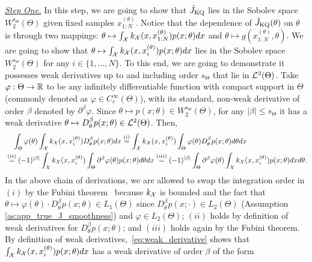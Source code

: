 \underline{\emph{Step One.}} In this step, we are going to show that $\hat{J}_{\text{KQ}}$ lies in the Sobolev space $W_2^{s_\Theta} (\Theta)$ given fixed samples $x_{1:N}^{(\theta)}$. 
Notice that the dependence of $\hat{J}_{\text{KQ}}(\theta)$ on $\theta$ is through two mappings: $\theta \mapsto \int_{\mathcal{X}} k_{\mathcal{X}} (x, x_{1:N}^{(\theta)}) p(x; \theta) dx$ and $\theta \mapsto g(x_{1:N}^{(\theta)}, \theta)$. 
We are going to show that $ \theta \mapsto \int_{\mathcal{X}} k_{\mathcal{X}} (x, x_i^{(\theta)}) p(x; \theta) dx$ lies in the Sobolev space $W_2^{s_\Theta} (\Theta)$ for any $i \in \{1, \ldots, N\}$. 
To this end, we are going to demonstrate it possesses weak derivatives up to and including order $s_\Theta$ that lie in $\mathcal{L}^2(\Theta)$.
Take $\varphi : \Theta \to \mathbb{R}$ to be any infinitely differentiable function with compact support in $\Theta$ (commonly denoted as $\varphi \in C_c^\infty(\Theta)$), with its standard, non-weak derivative of order $\beta$ denoted by $\partial^\beta \varphi$. Since $\theta \mapsto p(x; \theta) \in W_2^{s_\Theta}(\Theta)$, for any $| \beta| \leq s_\Theta$ it has a weak derivative $\theta \mapsto D_\theta^\beta p(x; \theta) \in \mathcal{L}^2(\Theta)$. Then,
\begin{align}\label{eq:weak_derivative}
\begin{aligned}
    &\quad \int_\Theta \varphi(\theta) \int_{\mathcal{X}} k_{\mathcal{X}} (x, x_i^{(\theta)}) D_\theta^\beta p(x; \theta) dx \stackrel{(i)}{=} \int_{\mathcal{X}} k_{\mathcal{X}} (x, x_i^{(\theta)}) \int_\Theta \varphi(\theta) D_\theta^\beta p(x; \theta) d\theta dx \\
    &\stackrel{(ii)}{=} (-1)^{|\beta|} \int_{\mathcal{X}} k_{\mathcal{X}} (x, x_i^{(\theta)}) \int_\Theta \partial^\beta \varphi(\theta) p(x; \theta) d\theta dx \stackrel{(iii)}{=} (-1)^{|\beta|} \int_\Theta \partial^\beta \varphi(\theta) \int_{\mathcal{X}} k_{\mathcal{X}} (x, x_i^{(\theta)}) p(x; \theta) dx d\theta. 
\end{aligned}
\end{align}
In the above chain of derivations, we are allowed to swap the integration order in $(i)$ by the Fubini theorem~\citep{rudin1964principles} because $k_{\mathcal{X}}$ is bounded and the fact that $\theta \mapsto \varphi(\theta) \cdot D_\theta^\beta p(x; \theta) \in L_1(\Theta)$ since $D_\theta^\beta p(x; \cdot) \in L_2(\Theta)$ (Assumption \ref{as:app_true_J_smoothness}) and $\varphi \in L_2(\Theta)$; $(ii)$ holds by definition of weak derivatives for $D_\theta^\beta p(x; \theta)$; and $(iii)$ holds again by the Fubini theorem. By definition of weak derivatives,~\eqref{eq:weak_derivative} shows that $\int_{\mathcal{X}} k_{\mathcal{X}} (x, x_i^{(\theta)}) p(x; \theta) dx$ has a weak derivative of order $\beta$ of the form
